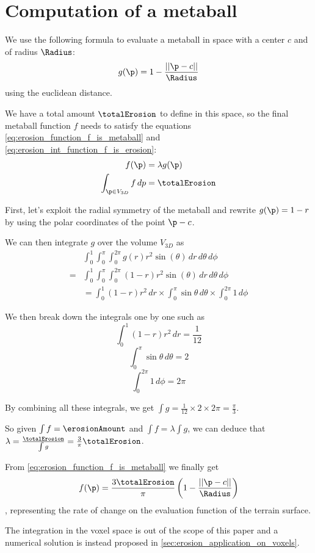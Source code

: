 \chapter{Computation of a metaball}
\label{sec:erosion_appendix_metaball}
We use the following formula to evaluate a metaball in space with a center $c$ and of radius $\Radius$:
$$ g(\p) = 1 - \frac{||\p - c||}{\Radius} $$
using the euclidean distance.

We have a total amount $\totalErosion$ to define in this space, so the final metaball function $f$ needs to satisfy the equations \eqref{eq:erosion_function_f_is_metaball} and \eqref{eq:erosion_int_function_f_is_erosion}:
\begin{align}
\label{eq:erosion_function_f_is_metaball}
f(\p) &= \lambda g(\p) \\
\label{eq:erosion_int_function_f_is_erosion}
\int_{\p \in V_{3D}}{f \, dp} &= \totalErosion
\end{align}

First, let's exploit the radial symmetry of the metaball and rewrite $g(\p) = 1 - r$ by using the polar coordinates of the point $\p - c$.

We can then integrate $g$ over the volume $V_{3D}$ as 
\begin{align}
&\int_{0}^{1}{ \int_{0}^{\pi}{ \int_{0}^{2\pi}{ g(r) r^2 \sin(\theta)\, dr} \, d\theta} \, d\phi} \nonumber \\
= &\int_{0}^{1}{ \int_{0}^{\pi}{ \int_{0}^{2\pi}{ (1 - r) r^2 \sin(\theta)\, dr} \, d\theta} \, d\phi} \nonumber \\
&= \int_{0}^{1}{ (1 - r)r^2 \, dr} \times \int_{0}^{\pi}{ \sin{\theta} \, d\theta } \times \int_{0}^{2\pi}{ 1 \, d\phi} \nonumber
\end{align}

We then break down the integrals one by one such as 
$$ \int_{0}^{1}{ (1 - r)r^2 \, dr} = \frac{1}{12} \nonumber$$ 
$$ \int_{0}^{\pi}{ \sin{\theta} \, d\theta } = 2 \nonumber$$ 
$$ \int_{0}^{2\pi}{ 1 \, d\phi} = 2 \pi \nonumber$$

By combining all these integrals, we get $\int{g} = \frac{1}{12} \times 2 \times 2\pi = \frac{\pi}{3}$.

So given $\int{f} = \erosionAmount$ and $\int{f} = \lambda \int{g}$, we can deduce that $\lambda = \frac{\totalErosion}{\int{g}} = \frac{3}{\pi}\totalErosion$.

From \eqref{eq:erosion_function_f_is_metaball} we finally get 
\begin{align} 
\label{eq:erosion_proofErosionMetaball}
f(\p) = \frac{3 \totalErosion}{\pi} \left(1 - \frac{||\p - c||}{\Radius} \right)
\end{align}
, representing the rate of change on the evaluation function of the terrain surface.

The integration in the voxel space is out of the scope of this paper and a numerical solution is instead proposed in \cref{sec:erosion_application_on_voxels}.